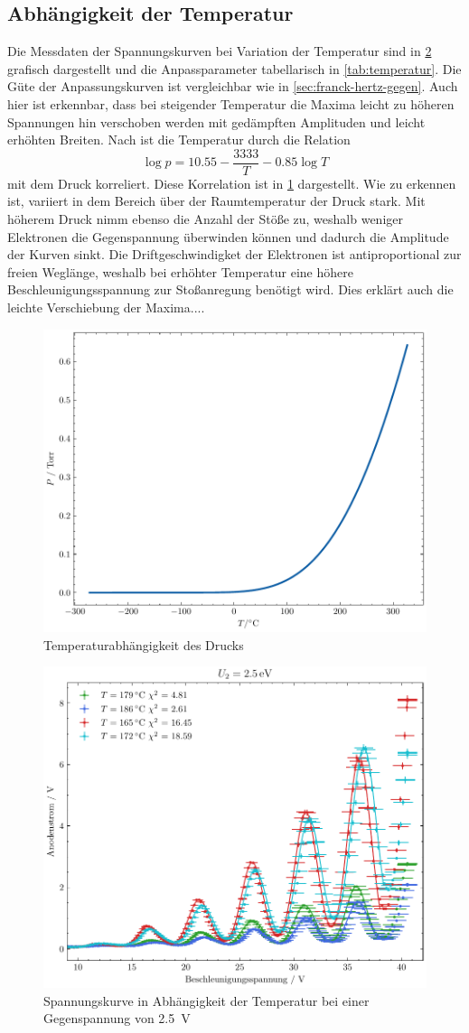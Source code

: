 \subsection{Abhängigkeit der Temperatur}
Die Messdaten der Spannungskurven bei Variation der Temperatur 
sind in \cref{fig:temperatur} grafisch dargestellt und die Anpassparameter 
tabellarisch in \cref{tab:temperatur}. Die Güte der Anpassungskurven ist 
vergleichbar wie in \cref{sec:franck-hertz-gegen}. Auch hier ist erkennbar, dass 
bei steigender Temperatur die Maxima leicht zu höheren Spannungen hin verschoben 
werden mit gedämpften Amplituden und leicht erhöhten Breiten. Nach \cite{skript}
ist die Temperatur durch die Relation 
\begin{equation*}
    \log p = \num{10.55}-\frac{3333}{T}-\num{0.85}\log T
\end{equation*}
mit dem Druck korreliert. Diese Korrelation ist in \cref{fig:druck_temp} dargestellt. Wie zu 
erkennen ist, variiert in dem Bereich über der Raumtemperatur der Druck stark. Mit 
höherem Druck nimm ebenso die Anzahl der Stöße zu, weshalb weniger Elektronen die Gegenspannung
überwinden können und dadurch die Amplitude der Kurven sinkt. Die Driftgeschwindigket 
der Elektronen ist antiproportional zur freien Weglänge, weshalb bei erhöhter Temperatur 
eine höhere Beschleunigungsspannung zur Stoßanregung benötigt wird. Dies erklärt auch 
die leichte Verschiebung der Maxima....

\begin{figure}[htb]
    \centering
    \includegraphics[width=.5\linewidth]{../figs/druck_temp}
    \caption{Temperaturabhängigkeit des Drucks}
    \label{fig:druck_temp}
\end{figure}


\begin{figure}[htb]
    \centering
    \includegraphics[width=0.6\linewidth]{../figs/franck-hertz_temperatur}
    \caption{Spannungskurve in Abhängigkeit der Temperatur bei einer Gegenspannung von \SI{2.5}{\volt}}
    \label{fig:temperatur}
\end{figure}





